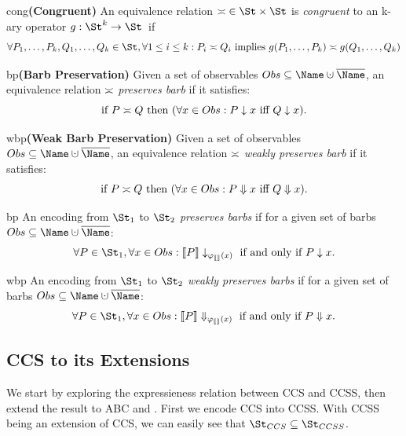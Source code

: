\documentclass[adraft,hidelinks]{eptcs}
\begin{document}
\begin{definition}{cong}\textbf{(Congruent)}
  An equivalence relation ${\eqv}\in\St\times\St$ is \emph{congruent} to an k-ary operator $g: \St^k\to\St$\ if
  \[\forall P_1, \dots, P_k, Q_1, \dots, Q_k \in \St, \forall 1\leq i\leq k: P_i\eqv Q_i \text{ implies } g(P_1, \dots, P_k) \eqv g(Q_1, \dots, Q_k)\]
\end{definition}

\begin{definition}{bp}\textbf{(Barb Preservation)}
  Given a set of observables $Obs\subseteq \Name\dcup\overline{\Name}$, an equivalence relation $\asymp$ \emph{preserves barb} if it satisfies:
  \[
  \text{if }P\asymp Q \text{ then } (\forall x \in Obs: P\downarrow x \text{ iff } Q\downarrow x).
  \]
\end{definition}

\begin{definition}{wbp}\textbf{(Weak Barb Preservation)}
  Given a set of observables $Obs\subseteq \Name\dcup\overline{\Name}$, an equivalence relation $\asymp$ \emph{weakly preserves barb} if it satisfies:
  \[
  \text{if }P\asymp Q \text{ then } (\forall x \in Obs: P\Downarrow x \text{ iff } Q\Downarrow x).
  \]
\end{definition}

\begin{criterion}{bp}
  An encoding from $\St_1$ to $\St_2$ \emph{preserves barbs} if for a given set of barbs $Obs\subseteq \Name\dcup\overline{\Name}$:
  \[
    \forall P \in \St_1, \forall x\in Obs: \bkt{P}\barb_{\ren x} \text{ if and only if } P\barb x.
  \]
\end{criterion}

\begin{criterion}{wbp}
  An encoding from $\St_1$ to $\St_2$ \emph{weakly preserves barbs} if for a given set of barbs $Obs\subseteq \Name\dcup\overline{\Name}$:
  \[
    \forall P \in \St_1, \forall x\in Obs: \bkt{P}\wbarb_{\ren x} \text{ if and only if } P\wbarb x.
  \]
\end{criterion}

\subsection{CCS to its Extensions}
\label{sec:ccs-ccss}
We start by exploring the expressieness relation between CCS and CCSS, then extend the result to ABC and \CSG.
First we encode CCS into CCSS.
With CCSS being an extension of CCS, we can easily see that $\Sccs\subseteq\Sccss$.
\end{document}

